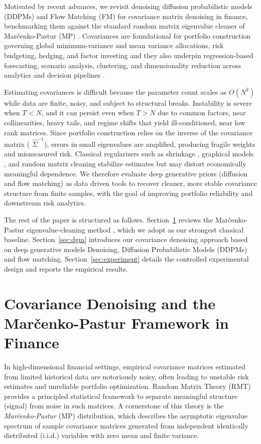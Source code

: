 \documentclass{article}
\begin{document}
Motivated by recent advances, we revisit denoising diffusion probabilistic models (DDPMs) and Flow Matching (FM) for covariance matrix denoising in finance, benchmarking them against the standard random matrix eigenvalue cleaner of Mar\v{c}enko-Pastur (MP) \cite{rmtbook}. Covariances are foundational for portfolio construction governing global minimum-variance and mean variance allocations, risk budgeting, hedging, and factor investing and they also underpin regression-based forecasting, scenario analysis, clustering, and dimensionality reduction across analytics and decision pipelines \cite{RiskAssetAllocation2005}.

Estimating covariances is difficult because the parameter count scales as $O(N^2)$ while data are finite, noisy, and subject to structural breaks. Instability is severe when $T<N$, and it can persist even when $T>N$ \cite{mlam2020} due to common factors, near collinearities, heavy tails, and regime shifts that yield ill-conditioned, near low rank matrices. Since portfolio construction relies on the inverse of the covariance matrix ( $\widehat{\Sigma}^{-1}$), errors in small eigenvalues are amplified, producing fragile weights and mismeasured risk. Classical regularizers such as shrinkage \cite{LedoitWolf2004}, graphical models \cite{graphcov2010}, and random matrix cleaning \cite{laloux2000} stabilize estimates but may distort economically meaningful dependence. We therefore evaluate deep generative priors (diffusion and flow matching) as data driven tools  to recover cleaner, more stable covariance structure from finite samples, with the goal of improving portfolio reliability and downstream risk analytics.


The rest of the paper is structured as follows. Section~\ref{sec:mp} reviews the Mar\v{c}enko-Pastur eigenvalue-cleaning method \cite{laloux2000}, which we adopt as our strongest classical baseline. Section~\ref{sec:dgm} introduces our covariance denoising approach based on deep generative models Denoising, Diffusion Probabilistic Models (DDPMs) and flow matching. Section~\ref{sec:experiment} details the controlled experimental design and reports the empirical results.


\section{Covariance Denoising and the Mar\v{c}enko-Pastur Framework in Finance}\label{sec:mp}

In high-dimensional financial settings, empirical covariance matrices estimated from limited historical data are notoriously noisy, often leading to unstable risk estimates and unreliable portfolio optimization. Random Matrix Theory (RMT) \cite{rmtbook} provides a principled statistical framework to separate meaningful structure (signal) from noise in such matrices. A cornerstone of this theory is the \emph{Mar\v{c}enko-Pastur} (MP) distribution, which describes the asymptotic eigenvalue spectrum of sample covariance matrices generated from independent identically distributed (i.i.d.) variables with zero mean and finite variance.  
\end{document}

